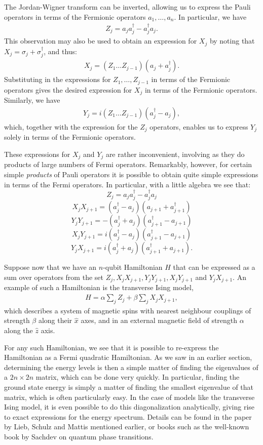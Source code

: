 \documentclass[12pt]{article}
\begin{document}
The Jordan-Wigner transform can be inverted, allowing us to express
the Pauli operators in terms of the Fermionic operators
$a_1,\ldots,a_n$.  In particular, we have
\begin{eqnarray}
  Z_j = a_ja_j^\dagger-a_j^\dagger a_j.
\end{eqnarray}
This observation may also be used to obtain an expression for $X_j$ by
noting that $X_j = \sigma_j +\sigma_j^\dagger$, and thus:
\begin{eqnarray}
  X_j = (Z_1 \ldots Z_{j-1}) (a_j+a_j^\dagger).
\end{eqnarray}
Substituting in the expressions for $Z_1,\ldots,Z_{j-1}$ in terms of
the Fermionic operators gives the desired expression for $X_j$ in
terms of the Fermionic operators.  Similarly, we have
\begin{eqnarray}
  Y_j = i (Z_1 \ldots Z_{j-1}) (a_{j}^\dagger-a_{j}),
\end{eqnarray}
which, together with the expression for the $Z_j$ operators, enables
us to express $Y_j$ solely in terms of the Fermionic operators.

These expressions for $X_j$ and $Y_j$ are rather inconvenient,
involving as they do products of large numbers of Fermi operators.
Remarkably, however, for certain simple \emph{products} of Pauli
operators it is possible to obtain quite simple expressions in terms
of the Fermi operators.  In particular, with a little algebra we see
that:
$$
  Z_j = a_ja_j^\dagger - a_j^\dagger a_j
$$
$$
  X_jX_{j+1} = (a_j^\dagger-a_j)(a_{j+1}+a_{j+1}^\dagger )
$$
$$
  Y_jY_{j+1} = -(a_j^\dagger+a_j)(a_{j+1}^\dagger-a_{j+1})
$$
$$
  X_jY_{j+1} =  i(a_j^\dagger-a_j) (a_{j+1}^\dagger-a_{j+1})
$$
$$
  Y_jX_{j+1} = i(a_j^\dagger+a_j) (a_{j+1}^\dagger+a_{j+1}).
$$

Suppose now that we have an $n$-qubit Hamiltonian $H$ that can be
expressed as a sum over operators from the set $Z_j,
X_jX_{j+1},Y_jY_{j+1},X_jY_{j+1}$ and $Y_{j}X_{j+1}$.  An example of
such a Hamiltonian is the transverse Ising model,
\begin{eqnarray}
  H = \alpha \sum_j Z_j + \beta \sum_j X_j X_{j+1},
\end{eqnarray}
which describes a system of magnetic spins with nearest neighbour
couplings of strength $\beta$ along their $\hat x$ axes, and in an
external magnetic field of strength $\alpha$ along the $\hat z$ axis.

For any such Hamiltonian, we see that it is possible to re-express the
Hamiltonian as a Fermi quadratic Hamiltonian.  As we saw in an earlier
section, determining the energy levels is then a simple matter of
finding the eigenvalues of a $2n \times 2n$ matrix, which can be done
very quickly. In particular, finding the ground state energy is simply
a matter of finding the smallest eigenvalue of that matrix, which is
often particularly easy.  In the case of models like the transverse
Ising model, it is even possible to do this diagonalization
analytically, giving rise to exact expressions for the energy
spectrum.  Details can be found in the paper by Lieb, Schulz and
Mattis mentioned earlier, or books such as the well-known book by
Sachdev on quantum phase transitions.
\end{document}
